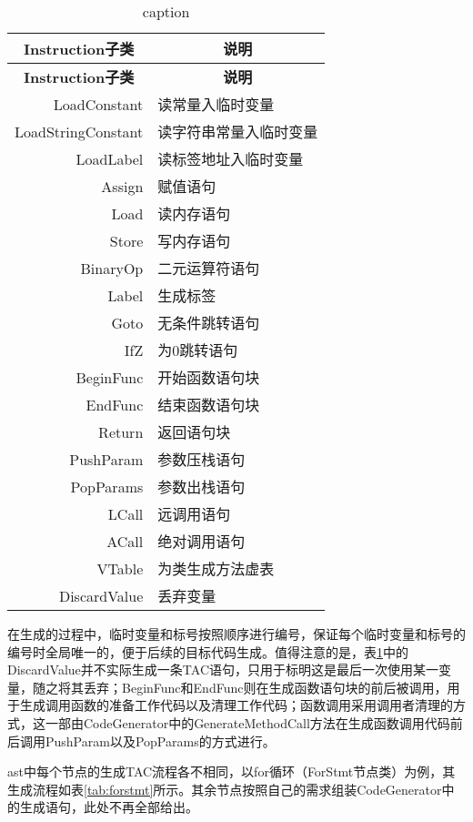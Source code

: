 \begin{center}
    \begin{longtable}{r l}
        \caption{caption}
        \label{tab:tac}\\
        \toprule
        \multicolumn{1}{c}{\textbf{Instruction子类}} &
        \multicolumn{1}{c}{\textbf{说明}} \\
        \cmidrule(lr){1-1} \cmidrule(lr){2-2}
        \endfirsthead

        \toprule
        \multicolumn{1}{c}{\textbf{Instruction子类}} &
        \multicolumn{1}{c}{\textbf{说明}} \\
        \cmidrule(lr){1-1} \cmidrule(lr){2-2}
        \endhead

        LoadConstant & 读常量入临时变量\\
        LoadStringConstant & 读字符串常量入临时变量\\
        LoadLabel & 读标签地址入临时变量\\
        Assign & 赋值语句\\
        Load & 读内存语句\\
        Store & 写内存语句\\
        BinaryOp & 二元运算符语句 \\
        Label & 生成标签\\
        Goto & 无条件跳转语句\\
        IfZ & 为0跳转语句\\
        BeginFunc & 开始函数语句块\\
        EndFunc & 结束函数语句块\\
        Return & 返回语句块\\
        PushParam & 参数压栈语句\\
        PopParams & 参数出栈语句\\
        LCall & 远调用语句\\
        ACall & 绝对调用语句\\
        VTable & 为类生成方法虚表\\
        DiscardValue & 丢弃变量\\
        \bottomrule
    \end{longtable}
\end{center}

\par 在生成的过程中，临时变量和标号按照顺序进行编号，保证每个临时变量和标号的编号时全局唯一的，便于后续的目标代码生成。值得注意的是，表\ref{tab:tac}中的DiscardValue并不实际生成一条TAC语句，只用于标明这是最后一次使用某一变量，随之将其丢弃；BeginFunc和EndFunc则在生成函数语句块的前后被调用，用于生成调用函数的准备工作代码以及清理工作代码；函数调用采用调用者清理的方式，这一部由CodeGenerator中的GenerateMethodCall方法在生成函数调用代码前后调用PushParam以及PopParams的方式进行。
\par ast中每个节点的生成TAC流程各不相同，以for循环（ForStmt节点类）为例，其生成流程如表\ref{tab:forstmt}所示。其余节点按照自己的需求组装CodeGenerator中的生成语句，此处不再全部给出。


